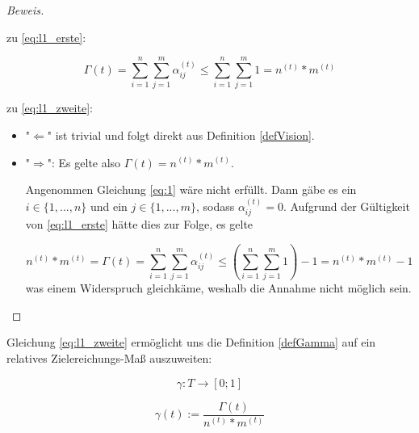 \begin{proof}[Beweis] \textrm{ }

\vspace{0.3cm}

  zu \eqref{eq:l1_erste}: 
  
\begin{equation*}
  \Gamma(t) = \sum_{i=1}^n \sum_{j=1}^m \alpha^{(t)}_{ij} \leq \sum_{i=1}^n \sum_{j=1}^m 1 = n^{(t)} * m^{(t)}
\end{equation*}

\vspace{0.3cm} 

zu \eqref{eq:l1_zweite}: 

\begin{itemize}
  \item "$\Leftarrow$" ist trivial und folgt direkt aus Definition \ref{defVision}.
  \item "$\Rightarrow$": Es gelte also $\Gamma(t) = n^{(t)} * m^{(t)}$.
  
  Angenommen Gleichung \eqref{eq:1} wäre nicht erfüllt. Dann gäbe es ein $i \in \{1,...,n\}$ und ein $j \in \{1,...,m\}$, sodass $\alpha^{(t)}_{ij} = 0$. Aufgrund der Gültigkeit von \eqref{eq:l1_erste} hätte dies zur Folge, es gelte
  
\begin{equation*}
  n^{(t)} * m^{(t)} = \Gamma(t) = \sum_{i=1}^n \sum_{j=1}^m \alpha^{(t)}_{ij} \leq (\sum_{i=1}^n \sum_{j=1}^m 1) - 1 = n^{(t)} * m^{(t)} - 1
\end{equation*}  
was einem Widerspruch gleichkäme, weshalb die Annahme nicht möglich sein.
  
\end{itemize}
  
\end{proof}

\vspace{0.3cm}

Gleichung \eqref{eq:l1_zweite} ermöglicht uns die Definition \ref{defGamma} auf ein relatives Zielereichungs-Maß auszuweiten:

\vspace{0.3cm}

\begin{Def}\label{defKleinGamma}
\begin{equation*}
  \gamma : T \rightarrow [0; 1] 
\end{equation*}

\begin{equation*}
  \gamma(t):= \frac{\Gamma(t)}{n^{(t)} * m^{(t)}}
\end{equation*}

\end{Def}

